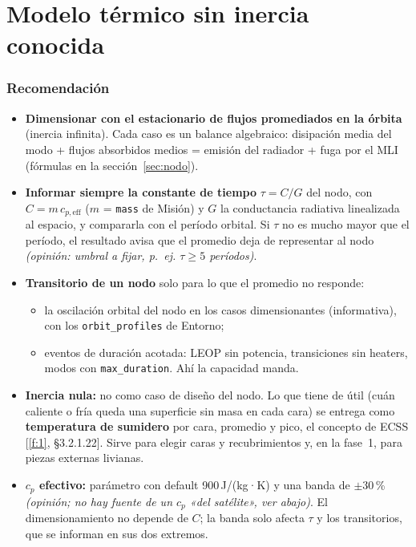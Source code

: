 \documentclass[11pt,a4paper]{article}
\newcommand{\code}[1]{\texttt{#1}}
\newcommand{\op}[1]{\textcolor{opinion}{\textit{(#1)}}}
\newcommand{\f}[1]{\ref{f:#1}}
\begin{document}
\section{Modelo térmico sin inercia conocida}\label{sec:modelo}

\subsubsection*{Recomendación}

\begin{itemize}
  \item \textbf{Dimensionar con el estacionario de flujos promediados en la órbita} (inercia infinita). Cada caso es un balance algebraico: disipación media del modo + flujos absorbidos medios = emisión del radiador + fuga por el MLI (fórmulas en la sección~\ref{sec:nodo}).
  \item \textbf{Informar siempre la constante de tiempo} $\tau = C/G$ del nodo, con $C = m\,c_{p,\mathrm{eff}}$ ($m$ = \code{mass} de Misión) y $G$ la conductancia radiativa linealizada al espacio, y compararla con el período orbital. Si $\tau$ no es mucho mayor que el período, el resultado avisa que el promedio deja de representar al nodo \op{opinión: umbral a fijar, p.~ej. $\tau \ge 5$ períodos}.
  \item \textbf{Transitorio de un nodo} solo para lo que el promedio no responde:
  \begin{itemize}
    \item la oscilación orbital del nodo en los casos dimensionantes (informativa), con los \code{orbit\_profiles} de Entorno;
    \item eventos de duración acotada: LEOP sin potencia, transiciones sin heaters, modos con \code{max\_duration}. Ahí la capacidad manda.
  \end{itemize}
  \item \textbf{Inercia nula:} no como caso de diseño del nodo. Lo que tiene de útil (cuán caliente o fría queda una superficie sin masa en cada cara) se entrega como \textbf{temperatura de sumidero} por cara, promedio y pico, el concepto de ECSS [\f{1}, §3.2.1.22]. Sirve para elegir caras y recubrimientos y, en la fase~1, para piezas externas livianas.
  \item \textbf{$c_p$ efectivo:} parámetro con default 900\,J/(kg·K) y una banda de $\pm$30\,\% \op{opinión; no hay fuente de un $c_p$ «del satélite», ver abajo}. El dimensionamiento no depende de $C$; la banda solo afecta $\tau$ y los transitorios, que se informan en sus dos extremos.
\end{itemize}
\end{document}
